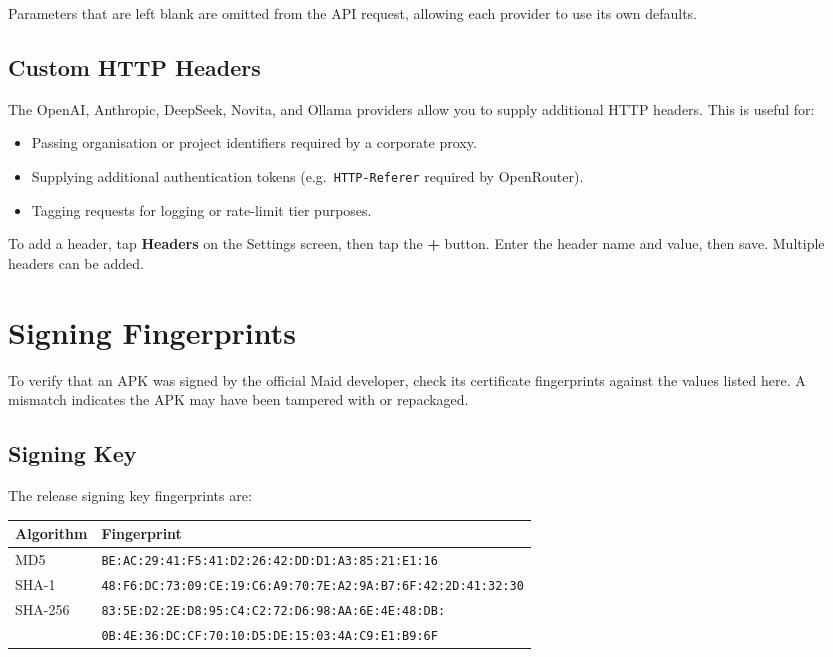 \documentclass[12pt,a4paper]{article}
\begin{document}
Parameters that are left blank are omitted from the API request, allowing each provider to use its own defaults.

\subsection{Custom HTTP Headers}
\label{sec:headers}

The OpenAI, Anthropic, DeepSeek, Novita, and Ollama providers allow you to supply additional HTTP headers. This is useful for:

\begin{itemize}[noitemsep]
    \item Passing organisation or project identifiers required by a corporate proxy.
    \item Supplying additional authentication tokens (e.g.\ \texttt{HTTP-Referer} required by OpenRouter).
    \item Tagging requests for logging or rate-limit tier purposes.
\end{itemize}

To add a header, tap \textbf{Headers} on the Settings screen, then tap the \textbf{+} button. Enter the header name and value, then save. Multiple headers can be added.

\section{Signing Fingerprints}

To verify that an APK was signed by the official Maid developer, check its certificate fingerprints against the values listed here. A mismatch indicates the APK may have been tampered with or repackaged.

\subsection{Signing Key}

The release signing key fingerprints are:

\begin{center}
\begin{tabular}{ll}
\toprule
\textbf{Algorithm} & \textbf{Fingerprint} \\
\midrule
MD5    & \texttt{BE:AC:29:41:F5:41:D2:26:42:DD:D1:A3:85:21:E1:16} \\
\addlinespace
SHA-1  & \texttt{48:F6:DC:73:09:CE:19:C6:A9:70:7E:A2:9A:B7:6F:42:2D:41:32:30} \\
\addlinespace
SHA-256 & \texttt{83:5E:D2:2E:D8:95:C4:C2:72:D6:98:AA:6E:4E:48:DB:} \\
        & \texttt{0B:4E:36:DC:CF:70:10:D5:DE:15:03:4A:C9:E1:B9:6F} \\
\bottomrule
\end{tabular}
\end{center}
\end{document}
